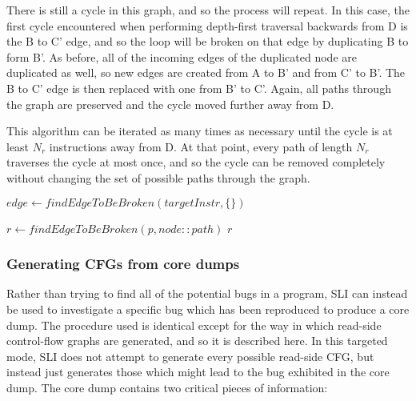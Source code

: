 There is still a cycle in this graph, and so the process will repeat.
In this case, the first cycle encountered when performing depth-first traversal backwards from D is the B to C' edge, and so the loop will be broken on that edge by duplicating B to form B'.
As before, all of the incoming edges of the duplicated node are duplicated as well, so new edges are created from A to B' and from C' to B'.
The B to C' edge is then replaced with one from B' to C'.
Again, all paths through the graph are preserved and the cycle moved further away from D.

This algorithm can be iterated as many times as necessary until the cycle is at least $N_r$ instructions away from D.
At that point, every path of length $N_r$ traverses the cycle at most once, and so the cycle can be removed completely without changing the set of possible paths through the graph.

\begin{algorithmic}
     \STATE $edge \gets findEdgeToBeBroken(targetInstr, \{\})$
     \ELSE
        \ENDFOR
     \ENDIF
  \ENDWHILE
\end{algorithmic}

\begin{algorithmic}
     \ENDIF
     \STATE $r \gets findEdgeToBeBroken(p, node::path)$
         \RETURN $r$
     \ENDIF
  \ENDFOR
\end{algorithmic}



\subsubsection{Generating CFGs from core dumps}

Rather than trying to find all of the potential bugs in a program, SLI can instead be used to investigate a specific bug which has been reproduced to produce a core dump.
The procedure used is identical except for the way in which read-side control-flow graphs are generated, and so it is described here.
In this targeted mode, SLI does not attempt to generate every possible read-side CFG, but instead just generates those which might lead to the bug exhibited in the core dump.
The core dump contains two critical pieces of information:

